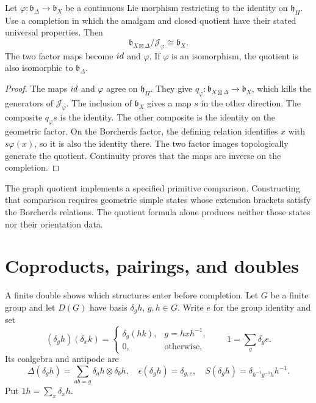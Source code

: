 \begin{proposition}\label{cyiv:graph-quotient}
Let $\varphi:\mathfrak b_\Delta\to\mathfrak b_X$ be a continuous Lie
morphism restricting to the identity on $\mathfrak h_\Pi$.
Use a completion in which the amalgam and closed quotient have
their stated universal properties.
Then
\[
 \mathfrak b_{X\boxtimes\Delta}/\mathcal J_\varphi
 \cong\mathfrak b_X.
\]
The two factor maps become $id$ and $\varphi$.
If $\varphi$ is an isomorphism, the quotient is also isomorphic
to $\mathfrak b_\Delta$.
\end{proposition}
\begin{proof}
The maps $id$ and $\varphi$ agree on $\mathfrak h_\Pi$.
They give $q_\varphi:\mathfrak b_{X\boxtimes\Delta}\to\mathfrak b_X$,
which kills the generators of $\mathcal J_\varphi$.
The inclusion of $\mathfrak b_X$ gives a map $s$ in the other direction.
The composite $q_\varphi s$ is the identity.
The other composite is the identity on the geometric factor.
On the Borcherds factor, the defining relation identifies $x$ with
$s\varphi(x)$, so it is also the identity there.
The two factor images topologically generate the quotient.
Continuity proves that the maps are inverse on the completion.
\end{proof}

The graph quotient implements a specified primitive comparison.
Constructing that comparison requires geometric simple states whose
extension brackets satisfy the Borcherds relations.
The quotient formula alone produces neither those states nor their
orientation data.

\section{Coproducts, pairings, and doubles}
A finite double shows which structures enter before completion.
Let $G$ be a finite group and let $D(G)$ have basis
$\delta_g h$, $g,h\in G$. Write $e$ for the group identity and set
\[
 (\delta_g h)(\delta_x k)
 =\begin{cases}\delta_g(hk),&g=hxh^{-1},\\0,&\text{otherwise},\end{cases}
 \qquad 1=\sum_g\delta_g e.
\]
Its coalgebra and antipode are
\[
 \Delta(\delta_g h)=\sum_{ab=g}\delta_a h\otimes\delta_b h,
 \quad \epsilon(\delta_g h)=\delta_{g,e},
 \quad S(\delta_g h)=\delta_{h^{-1}g^{-1}h}h^{-1}.
\]
Put $1h=\sum_x\delta_xh$.

